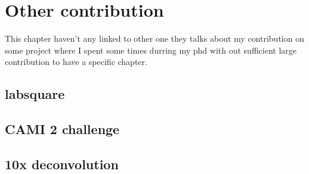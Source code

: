 \documentclass[main.tex]{subfiles}
\begin{document}
\chapter{Other contribution}

This chapter haven't any linked to other one they talks about my contribution on some project where I spent some times durring my phd with out sufficient large contribution to have a specific chapter.

\section{labsquare}

\section{CAMI 2 challenge}


\section{10x deconvolution}



\end{document}
